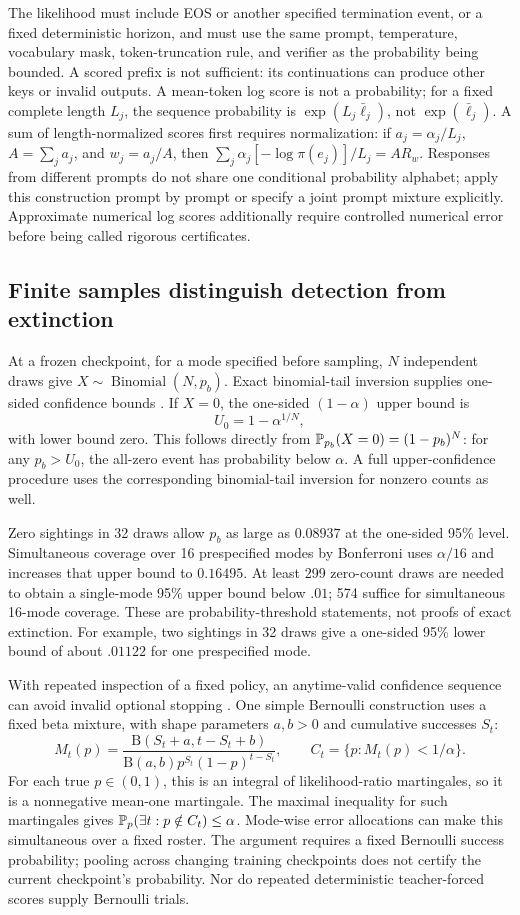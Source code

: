 The likelihood must include EOS or another specified termination event,
or a fixed deterministic horizon, and must use the same prompt, temperature,
vocabulary mask, token-truncation rule, and verifier as the probability being
bounded. A scored prefix is not sufficient: its continuations can produce
other keys or invalid outputs. A mean-token log score is not a probability;
for a fixed complete length $L_j$, the sequence probability is
$\exp(L_j\bar\ell_j)$, not $\exp(\bar\ell_j)$.
A sum of length-normalized scores first requires normalization:
if $a_j=\alpha_j/L_j$, $A=\sum_j a_j$, and $w_j=a_j/A$, then
$\sum_j\alpha_j[-\log\pi(e_j)]/L_j=A R_w$.
Responses from different prompts do not share one conditional probability
alphabet; apply this construction prompt by prompt or specify a joint prompt
mixture explicitly. Approximate numerical log scores additionally require
controlled numerical error before being called rigorous certificates.

\subsection{Finite samples distinguish detection from extinction}
At a frozen checkpoint, for a mode specified before sampling, $N$
independent draws give $X\sim\operatorname{Binomial}(N,p_b)$.
Exact binomial-tail inversion supplies one-sided confidence bounds
\cite{clopper1934}. If $X=0$, the one-sided $(1-\alpha)$ upper bound is
\[
 U_0=1-\alpha^{1/N},
\]
with lower bound zero. This follows directly from
$\mathbb P_{p_b}(X=0)=(1-p_b)^N$: for any $p_b>U_0$, the all-zero event has
probability below $\alpha$. A full upper-confidence procedure uses the
corresponding binomial-tail inversion for nonzero counts as well.

Zero sightings in 32 draws allow $p_b$ as large as $0.08937$ at the
one-sided 95\% level. Simultaneous coverage over 16 prespecified modes by
Bonferroni uses $\alpha/16$ and increases that upper bound to $0.16495$.
At least 299 zero-count draws are needed to obtain a single-mode 95\%
upper bound below $.01$; 574 suffice for simultaneous 16-mode coverage.
These are probability-threshold statements, not proofs of exact extinction.
For example, two sightings in 32 draws give a one-sided 95\% lower bound
of about $.01122$ for one prespecified mode.

With repeated inspection of a fixed policy, an anytime-valid confidence
sequence can avoid invalid optional stopping \cite{howard2021}. One simple
Bernoulli construction uses a fixed beta mixture, with shape parameters
$a,b>0$ and cumulative successes $S_t$:
\[
 M_t(p)=\frac{\mathrm B(S_t+a,t-S_t+b)}
 {\mathrm B(a,b)p^{S_t}(1-p)^{t-S_t}},\qquad
 C_t=\{p:M_t(p)<1/\alpha\}.
\]
For each true $p\in(0,1)$, this is an integral of likelihood-ratio martingales,
so it is a nonnegative mean-one martingale. The maximal inequality for such
martingales gives
$\mathbb P_p(\exists t:p\notin C_t)\le\alpha$.
Mode-wise error allocations can make this simultaneous over a fixed roster.
The argument requires a fixed Bernoulli success probability; pooling across
changing training checkpoints does not certify the current checkpoint's
probability. Nor do repeated deterministic teacher-forced scores supply
Bernoulli trials.

